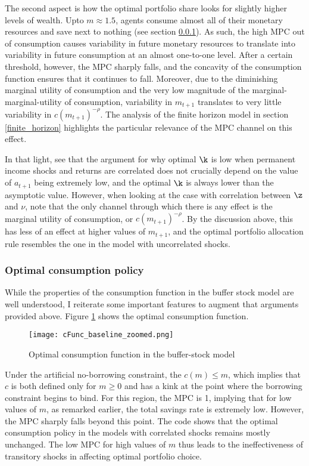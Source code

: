 The second aspect is how the optimal portfolio share looks for slightly higher levels of wealth. Upto $m \approx 1.5$, agents consume almost all of their monetary resources and save next to nothing (see section \ref{consumption_baseline}). As such, the high MPC out of consumption causes variability in future monetary resources to translate into variability in future consumption at an almost one-to-one level. After a certain threshold, however, the MPC sharply falls, and the concavity of the consumption function ensures that it continues to fall. Moreover, due to the diminishing marginal utility of consumption and the very low magnitude of the marginal-marginal-utility of consumption, variability in $m_{t+1}$ translates to very little variability in $c(m_{t+1})^{-\rho}$. The analysis of the finite horizon model in section \ref{finite_horizon} highlights the particular relevance of the MPC channel on this effect.

In that light, see that the argument for why optimal $\k$ is low when permanent income shocks and returns are correlated does not crucially depend on the value of $a_{t+1}$ being extremely low, and the optimal $\k$ is always lower than the asymptotic value. However, when looking at the case with correlation between $\z$ and $\nu$, note that the only channel through which there is any effect is the marginal utility of consumption, or $c(m_{t+1})^{-\rho}$. By the discussion above, this has less of an effect at higher values of $m_{t+1}$, and the optimal portfolio allocation rule resembles the one in the model with uncorrelated shocks.

\subsubsection{Optimal consumption policy}\label{consumption_baseline}

While the properties of the consumption function in the buffer stock model are well understood, I reiterate some important features to augment that arguments provided above. Figure \ref{fig:baseline_consumption} shows the optimal consumption function.

\begin{figure}[h]
    \texttt{[image: cFunc\_baseline\_zoomed.png]}
    \caption{Optimal consumption function in the buffer-stock model}
    \label{fig:baseline_consumption}
\end{figure}

Under the artificial no-borrowing constraint, the $c(m) \leq m$, which implies that $c$ is both defined only for $m \geq 0$ and has a kink at the point where the borrowing constraint begins to bind. For this region, the MPC is 1, implying that for low values of $m$, as remarked earlier, the total  savings rate is extremely low. However, the MPC sharply falls beyond this point. The code shows that the optimal consumption policy in the models with correlated shocks remains mostly unchanged. The low MPC for high values of $m$ thus leads to the ineffectiveness of transitory shocks in affecting optimal portfolio choice.

